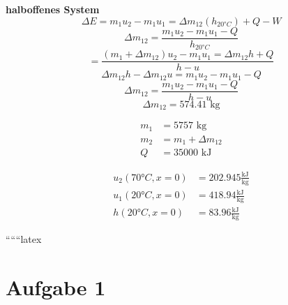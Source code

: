 \textbf{halboffenes System} \\
\begin{equation*}
    \Delta E = m_1 u_2 - m_1 u_1 = \Delta m_{12} \left( h_{20°C} \right) + Q - W
\end{equation*}
\begin{equation*}
    \Delta m_{12} = \frac{m_1 u_2 - m_1 u_1 - Q}{h_{20°C}}
\end{equation*}
\begin{equation*}
    = \frac{(m_1 + \Delta m_{12}) u_2 - m_1 u_1 = \Delta m_{12} h + Q}{h - u}
\end{equation*}
\begin{equation*}
    \Delta m_{12} h - \Delta m_{12} u = m_1 u_2 - m_1 u_1 - Q
\end{equation*}
\begin{equation*}
    \Delta m_{12} = \frac{m_1 u_2 - m_1 u_1 - Q}{h - u}
\end{equation*}
\begin{equation*}
    \Delta m_{12} = 574.41 \text{ kg}
\end{equation*}

\begin{align*}
    m_1 &= 5757 \text{ kg} \\
    m_2 &= m_1 + \Delta m_{12} \\
    Q &= 35000 \text{ kJ}
\end{align*}

\begin{align*}
    u_2 \left( 70°C, x = 0 \right) &= 202.945 \frac{\text{kJ}}{\text{kg}} \\
    u_1 \left( 20°C, x = 0 \right) &= 418.94 \frac{\text{kJ}}{\text{kg}} \\
    h \left( 20°C, x = 0 \right) &= 83.96 \frac{\text{kJ}}{\text{kg}}
\end{align*}

``````latex


\section*{Aufgabe 1}